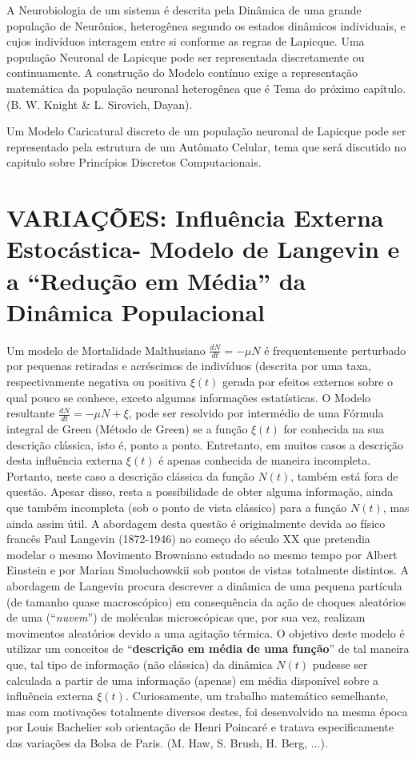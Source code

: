     A Neurobiologia de um sistema é descrita pela Dinâmica de uma grande população de Neurônios, heterogênea segundo os estados dinâmicos individuais, e cujos indivíduos interagem entre si conforme as regras de Lapicque. Uma população Neuronal de Lapicque pode ser representada discretamente ou continuamente. A construção do Modelo contínuo exige a representação matemática da população neuronal heterogênea que é Tema do próximo capítulo. (B. W. Knight \& L. Sirovich, Dayan).

    Um Modelo Caricatural discreto de um população neuronal de Lapicque pode ser representado pela estrutura de um Autômato Celular, tema que será discutido no capitulo sobre Princípios Discretos Computacionais.

\section{VARIAÇÕES: Influência Externa Estocástica- Modelo de Langevin e a ``Redução em Média'' da Dinâmica Populacional}

    Um modelo de Mortalidade Malthusiano \(\frac{dN}{dt} = -\mu N\) é frequentemente perturbado por pequenas retiradas e acréscimos de indivíduos (descrita por uma taxa, respectivamente negativa ou positiva \(\xi(t)\) gerada por efeitos externos sobre o qual pouco se conhece, exceto algumas informações estatísticas. O Modelo resultante \(\frac{dN}{dt} = -\mu N + \xi\), pode ser resolvido por intermédio de uma Fórmula integral de Green (Método de Green) se a função \(\xi(t)\) for conhecida na sua descrição clássica, isto é, ponto a ponto. Entretanto, em muitos casos a descrição desta influência externa \(\xi(t)\) é apenas conhecida de maneira incompleta. Portanto, neste caso a descrição clássica da função \(N(t)\), também está fora de questão. Apesar disso, resta a possibilidade de obter alguma informação, ainda que também incompleta (sob o ponto de vista clássico) para a função \(N(t)\), mas ainda assim útil. A abordagem desta questão é originalmente devida ao físico francês Paul Langevin (1872-1946) no começo do século XX que pretendia modelar o mesmo Movimento Browniano estudado ao mesmo tempo por Albert Einstein e por Marian Smoluchowskii sob pontos de vistas totalmente distintos. A abordagem de Langevin procura descrever a dinâmica de uma pequena partícula (de tamanho quase macroscópico) em consequência da ação de choques aleatórios de uma (``\textit{nuvem}'') de moléculas microscópicas que, por sua vez, realizam movimentos aleatórios devido a uma agitação térmica. O objetivo deste modelo é utilizar um conceitos de ``\textbf{descrição em média de uma função}'' de tal maneira que, tal tipo de informação (não clássica) da dinâmica \(N(t)\) pudesse ser calculada a partir de uma informação (apenas) em média disponível sobre a influência externa \(\xi(t)\). Curiosamente, um trabalho matemático semelhante, mas com motivações totalmente diversos destes, foi desenvolvido na mesma época por Louis Bachelier sob orientação de Henri Poincaré e tratava especificamente das variações da Bolsa de Paris. (M. Haw, S. Brush, H. Berg, ...).


